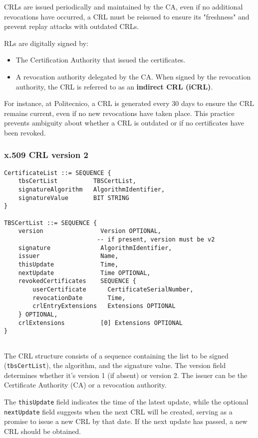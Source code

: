 CRLs are issued periodically and maintained by the CA, even if no
additional revocations have occurred, a CRL must be reissued to ensure
its "freshness" and prevent replay attacks with outdated CRLs.

RLs are digitally signed by:
\begin{itemize}
  \item The Certification Authority that issued the 
    certificates.
  \item A revocation authority delegated by the CA. When 
    signed by the revocation authority, the CRL is referred 
    to as an \textbf{indirect CRL (iCRL)}.
\end{itemize}

For instance, at Politecnico, a CRL is generated every 30 days 
to ensure the CRL remains current, even if no new revocations 
have taken place. This practice prevents ambiguity about whether 
a CRL is outdated or if no certificates have been revoked.
\subsubsection{x.509 CRL version 2}
\begin{verbatim}
CertificateList ::= SEQUENCE {
    tbsCertList          TBSCertList,
    signatureAlgorithm   AlgorithmIdentifier,
    signatureValue       BIT STRING
}

TBSCertList ::= SEQUENCE {
    version                Version OPTIONAL,
                          -- if present, version must be v2
    signature              AlgorithmIdentifier,
    issuer                 Name,
    thisUpdate             Time,
    nextUpdate             Time OPTIONAL,
    revokedCertificates    SEQUENCE {
        userCertificate      CertificateSerialNumber,
        revocationDate       Time,
        crlEntryExtensions   Extensions OPTIONAL
    } OPTIONAL,
    crlExtensions          [0] Extensions OPTIONAL
}


\end{verbatim}
The CRL structure consists of a sequence containing the list to be
signed (\texttt{tbsCertList}), the algorithm, and the signature value.
The version field determines whether it's version 1 (if absent) or
version 2. The issuer can be the Certificate Authority (CA) or a
revocation authority. 

The \texttt{thisUpdate} field indicates the time of the latest update, 
while the optional \texttt{nextUpdate} field suggests when the next CRL 
will be created, serving as a promise to issue a new CRL by that date. 
If the next update has passed, a new CRL should be obtained.


